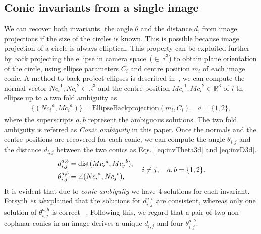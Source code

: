 \documentclass{bmvc2k}
\def\etal{\emph{et al}\bmvaOneDot}
\begin{document}
\subsection{Conic invariants from a single image}\label{ssec:conicInv2D}
We can recover both invariants, the angle $\theta$ and the distance $d$, from image projections if the size of the circles is known.
This is possible because image projection of a circle is always elliptical. 
This property can be exploited further by back projecting the ellipse in camera space~($ \in \mathbb{R}^3 $) to obtain plane orientation of the circle, using ellipse parameters $C_i$ and centre position $m_i$ of each image conic.
A method to back project ellipses is described in~\cite{forsyth_91}, we can compute the normal vector ${Nc_i}^1,{Nc_i}^2 \in \mathbb{R}^3$ and the centre position ${Mc_i}^1, {Mc_i}^2 \in \mathbb{R}^3$ of $i$-th ellipse up to a two fold ambiguity as
\begin{align} \label{Eq:Backprojection}
\{ ( {Nc_i}^a,{Mc_i}^a ) \} = \text{EllipseBackprojection}(m_i,C_i),~~~ a = \{1,2\}, %
\end{align}
where the superscripts $a,b$ represent the ambiguous solutions.
The two fold ambiguity is referred as \textit{ Conic ambiguity} in this paper.
Once the normals and the centre positions are recovered for each conic, we can compute the angle $\theta_{i,j}$ and the distance $d_{i,j}$ between the two conics as Eqs.~\ref{eq:invTheta3d} and \ref{eq:invD3d}. 
\begin{align}\label{eq:inv2D}
\left. \begin{aligned}
d_{i,j}^{a,b} &= {\rm dist}({Mc_i}^a,{Mc_j}^b),\\
\theta_{i,j}^{a,b} &= \angle({Nc_i}^a,{Nc_j}^b),
\end{aligned}
\right. ~~~i \neq j, ~~~ a,b = \{ 1,2 \}.
\end{align}
It is evident that due to \textit{conic ambiguity} we have 4 solutions for each invariant. 
Forsyth \etal explained that the solutions for $d_{i,j}^{a,b}$ are consistent, whereas only one solution of $\theta_{i,j}^{a,b}$ is correct ~\cite{forsyth_91}.
Following this, we regard that a pair of two non-coplanar conics in an image derives a unique $d_{i,j}$ and four $\theta_{i,j}^{a,b}$.
\end{document}

